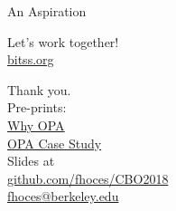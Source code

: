 \documentclass{beamer}
\def\blue{\color{blue}}
\begin{document}
\begin{frame}{An Aspiration}
\end{frame}




\begin{frame}[noframenumbering]
\begin{center}
\vspace*{4em}
{\LARGE Let's work together!\\}
{\blue \href{https://www.bitss.org/}{bitss.org}}
\end{center}
\end{frame}



\begin{frame}[noframenumbering]
\begin{center}
\vspace*{6em}
{\LARGE Thank you.\\}
\bigskip
{\small
Pre-prints:\\
{\blue \href{https://osf.io/preprints/bitss/jnyqh}{Why OPA} } \\
{\blue \href{https://osf.io/preprints/bitss/ba7tr/}{OPA Case Study}  } \\
\medskip
Slides at \\
{\blue \href{http://www.github.com/fhoces/CBO2018}{github.com/fhoces/CBO2018}  }
\bigskip \\
\href{mailto:fhoces@berkeley.edu}{fhoces@berkeley.edu}
}
\end{center}
\end{frame}
\end{document}
